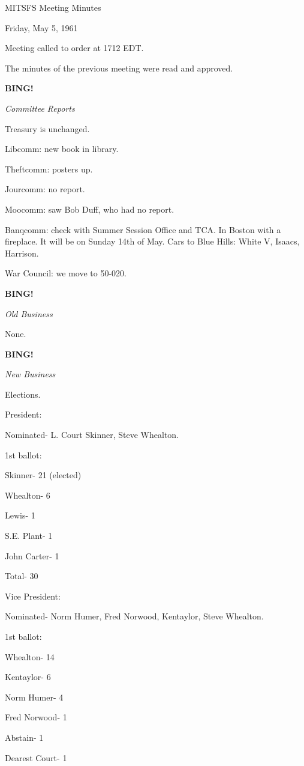 \documentclass[12pt]{article}
\newcommand{\bing}{{\bf BING!} }
\newcommand{\goto}[1]{\bing \vskip 12pt \centerline{{\em{#1}}}}
\begin{document}
\begin{center}

MITSFS Meeting Minutes

Friday, May 5, 1961

\end{center}
 
\vspace{12pt}

\setlength{\parskip}{6pt}

\noindent
Meeting called to order at 1712 EDT.

The minutes of the previous meeting were read and approved.

\goto{Committee Reports}

Treasury is unchanged.

Libcomm: new book in library.

Theftcomm: posters up.

Jourcomm: no report.

Moocomm: saw Bob Duff, who had no report.

Banqcomm: check with Summer Session Office and TCA. In Boston with a fireplace. It will be on Sunday 14th of May. Cars to Blue Hills: White V, Isaacs, Harrison.

War Council: we move to 50-020.

\goto{Old Business}

None.

\goto{New Business}

Elections.

President:

Nominated- L. Court Skinner, Steve Whealton.

1st ballot:

Skinner- 21 (elected)

Whealton- 6

Lewis- 1

S.E. Plant- 1

John Carter- 1

Total- 30

Vice President:

Nominated- Norm Humer, Fred Norwood, Kentaylor, Steve Whealton.

1st ballot:

Whealton- 14

Kentaylor- 6

Norm Humer- 4

Fred Norwood- 1

Abstain- 1

Dearest Court- 1
\end{document}
